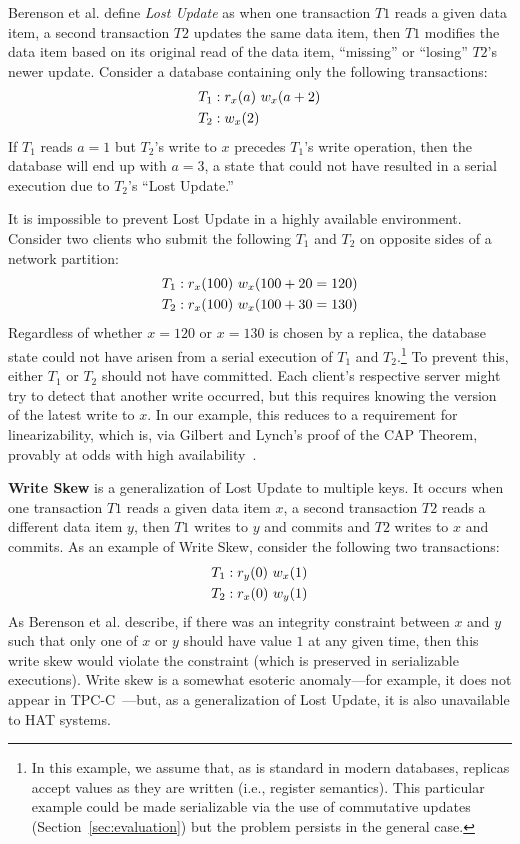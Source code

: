 {Berenson et al. define \textit{Lost Update} as when one
transaction $T1$ reads a given data item, a second transaction $T2$
updates the same data item, then $T1$ modifies the data item based on
its original read of the data item, ``missing'' or ``losing'' $T2$'s
newer update. Consider a database containing only the following
transactions:
\begin{align*}
\small\vspace{-1em}
T_1 &: r_x(a)~w_x(a+2)
\\T_2 &: w_x(2)\vspace{-1em}
\end{align*}
If $T_1$ reads $a=1$ but $T_2$'s write to $x$ precedes $T_1$'s write
operation, then the database will end up with $a=3$, a state that
could not have resulted in a serial execution due to $T_2$'s
``Lost Update.''

It is impossible to prevent Lost Update in a highly available
environment. Consider two clients who submit the following $T_1$ and
$T_2$ on opposite sides of a network partition:
\begin{align*}
\small\vspace{-1em}
T_1 &: r_x(100)~w_x(100+20=120)
\\T_2 &: r_x(100)~w_x(100+30=130)\vspace{-1em}
\end{align*}
Regardless of whether $x=120$ or $x=130$ is chosen by a replica, the
database state could not have arisen from a serial execution of $T_1$ and
$T_2$.\footnote{In this example, we assume that, as is standard in
  modern databases, replicas accept values as they are written (i.e.,
  register semantics). This particular example could be made
  serializable via the use of commutative updates
  (Section~\ref{sec:evaluation}) but the problem persists in the
  general case.}  To prevent this, either $T_1$ or
$T_2$ should not have committed. Each client's respective server might
try to detect that another write occurred, but this requires knowing
the version of the latest write to $x$. In our example, this reduces
to a requirement for linearizability, which is, via Gilbert and
Lynch's proof of the CAP Theorem, provably at odds with high
availability~\cite{gilbert-cap}.

\textbf{Write Skew} is a generalization of Lost Update to multiple
keys. It occurs when one transaction $T1$ reads a given data item $x$,
a second transaction $T2$ reads a different data item $y$, then $T1$
writes to $y$ and commits and $T2$ writes to $x$ and commits. As an
example of Write Skew, consider the following two transactions:
\begin{align*}
\small
T_1 &: r_y(0)~w_x(1)
\\T_2 &: r_x(0)~w_y(1)
\end{align*}
As Berenson et al. describe, if there was an integrity constraint
between $x$ and $y$ such that only one of $x$ or $y$ should have value
$1$ at any given time, then this write skew would violate the constraint (which is preserved in serializable executions). Write skew is a somewhat
esoteric anomaly---for example, it does not appear in
TPC-C~\cite{snapshot-serializable}---but, as a generalization of Lost
Update, it is also unavailable to HAT systems.

}
